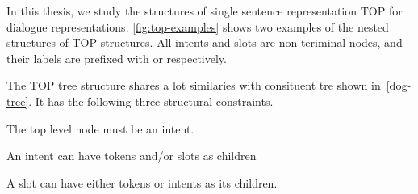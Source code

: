 In this thesis, we study the structures of single sentence
representation TOP for dialogue
representations. \autoref{fig:top-examples} shows two examples of the
nested structures of TOP structures. All intents and slots are
non-teriminal nodes, and their labels are prefixed with  or
 respectively.

The TOP tree structure shares a lot similaries with consituent tre
shown in~\autoref{dog-tree}. It has the following three structural
constraints.
\begin{inparaenum}[(1)]
\item The top level node must be an intent.
\item An intent can have tokens and/or slots as children
\item A slot can have either tokens or intents as its children.
\end{inparaenum}

